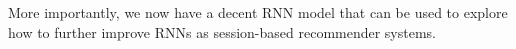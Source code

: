 More importantly, we now have a decent RNN model that can be used to explore how to further improve RNNs as session-based recommender systems.


	
	
